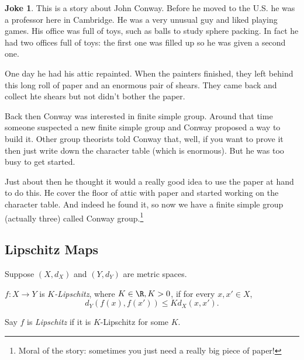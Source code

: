 \documentclass[a4paper]{article}
\theoremstyle{definition}
\newtheorem*{joke}{Joke}
\begin{document}
\begin{joke}
  This is a story about John Conway. Before he moved to the U.S. he was a professor here in Cambridge. He was a very unusual guy and liked playing games. His office was full of toys, such as balls to study sphere packing. In fact he had two offices full of toys: the first one was filled up so he was given a second one.

  One day he had his attic repainted. When the painters finished, they left behind this long roll of paper and an enormous pair of shears. They came back and collect hte shears but not didn't bother the paper.

  Back then Conway was interested in finite simple group. Around that time someone suspected a new finite simple group and Conway proposed a way to build it. Other group theorists told Conway that, well, if you want to prove it then just write down the character table (which is enormous). But he was too busy to get started.

  Just about then he thought it would a really good idea to use the paper at hand to do this. He cover the floor of attic with paper and started working on the character table. And indeed he found it, so now we have a finite simple group (actually three) called Conway group.\footnote{Moral of the story: sometimes you just need a really big piece of paper!}
\end{joke}

\subsection{Lipschitz Maps}

Suppose \((X, d_X)\) and \((Y, d_Y)\) are metric spaces.

\begin{definition}
  \(f: X \to Y\) is \emph{\(K\)-Lipschitz}, where \(K \in \R, K > 0\), if for every \(x, x' \in X\),
  \[
    d_Y(f(x), f(x')) \leq K d_X(x, x').
  \]

  Say \(f\) is \emph{Lipschitz} if it is \(K\)-Lipschitz for some \(K\).
\end{definition}
\end{document}
